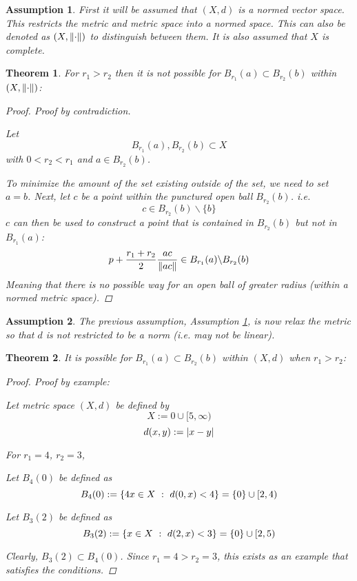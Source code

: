 \documentclass[]{article}
\newcommand{\st}{\ : \ }
\newtheorem{assumption}{Assumption}
\newtheorem{theorem}{Theorem}
\begin{document}
\begin{assumption}\label{ass:normed_metric}
    First it will be assumed that $(X,d)$ is a normed vector space.
    This restricts the metric and metric space into a normed space.
    This can also be denoted as $(X,\norm{\cdot})$ to distinguish between them.
    It is also assumed that $X$ is complete.
\end{assumption}

\begin{theorem}
    For  $r_1 > r_2$ then it is not possible for $B_{r_1}(a) \subset B_{r_2}(b)$ within $(X, \norm{\cdot})$:
    \begin{proof}
        Proof by contradiction.
        
        Let \[
            B_{r_1}(a), B_{r_2}(b) \subset X
        \]
        with $0 < r_2 < r_1$
        and $a \in B_{r_2}(b)$.

        To minimize the amount of the set existing outside of the set,
        we need to set $a = b$.
        Next, let $c$ be a point within the punctured open ball $B_{r_2}(b)$.
        i.e.\[
            c \in B_{r_2}(b) \backslash \{b\}
        \]
        $c$ can then be used to construct a point that is contained in $B_{r_2}(b)$ but not in $B_{r_1}(a)$:
        \[
            p + \frac{r_1 + r_2}{2} \frac{a c}{\norm{a c}} \in B_{r_1}(a) \backslash B_{r_2}(b)
        \]
        Meaning that there is no possible way for an open ball of greater radius (within a normed metric space).
    \end{proof}
\end{theorem}

\begin{assumption}
    The previous assumption, Assumption \ref{ass:normed_metric}, is now relax the metric so that $d$ is not restricted to be a norm (i.e. may not be linear).
\end{assumption}

\begin{theorem}
    It is possible for $B_{r_1}(a) \subset B_{r_2}(b)$ within $(X, d)$ when $r_1 > r_2$:
    \begin{proof}
        Proof by example:

        Let metric space $(X, d)$ be defined by
        \[X := {0} \cup [5, \infty)\]
        \[d(x,y) := \abs{x - y}\]

        For $r_1 = 4$, $r_2 = 3$, 

        Let $B_4(0)$ be defined as
        \[
            B_4(0) := \qty{4
                x \in X \st d(0,x) < 4
            } = \{0\} \cup [2,4)
        \]
        
        Let $B_3(2)$ be defined as
        \[
            B_3(2) := \qty{
                x \in X \st d(2,x) < 3
            } = \{0\} \cup [2, 5)
        \]

        Clearly, $B_3(2) \subset B_4(0)$.
        Since $r_1 = 4 > r_2 = 3$, this exists as an example that satisfies the conditions.
    \end{proof}
\end{theorem}
\end{document}
